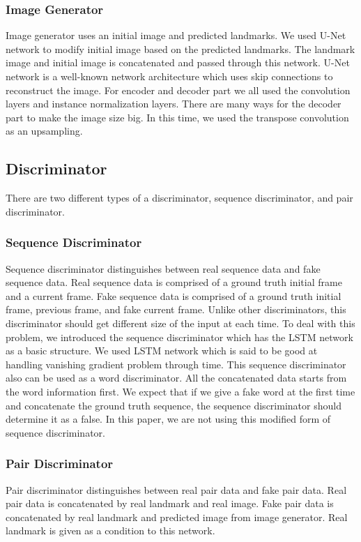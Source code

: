 \documentclass[10pt,twocolumn,letterpaper]{article}
\begin{document}
\subsubsection{Image Generator}

Image generator uses an initial image and predicted landmarks. We used U-Net network to modify initial image based on the predicted landmarks. The landmark image and initial image is concatenated and passed through this network. U-Net network is a well-known network architecture which uses skip connections to reconstruct the image. For encoder and decoder part we all used the convolution layers and instance normalization layers. There are many ways for the decoder part to make the image size big. In this time, we used the transpose convolution as an upsampling.

\subsection{Discriminator}
 There are two different types of a discriminator, sequence discriminator, and pair discriminator.
\subsubsection{Sequence Discriminator}
Sequence discriminator distinguishes between real sequence data and fake sequence data. Real sequence data is comprised of a ground truth initial frame and a current frame. Fake sequence data is comprised of a ground truth initial frame, previous frame, and fake current frame. Unlike other discriminators, this discriminator should get different size of the input at each time. To deal with this problem, we introduced the sequence discriminator which has the LSTM network as a basic structure. We used LSTM network which is said to be good at handling vanishing gradient problem through time.
This sequence discriminator also can be used as a word discriminator. All the concatenated data starts from the word information first. We expect that if we give a fake word at the first time and concatenate the ground truth sequence, the sequence discriminator should determine it as a false. In this paper, we are not using this modified form of sequence discriminator.
\subsubsection{Pair Discriminator}
Pair discriminator distinguishes between real pair data and fake pair data. Real pair data is concatenated by real landmark and real image. Fake pair data is concatenated by real landmark and predicted image from image generator. Real landmark is given as a condition to this network.
\end{document}
